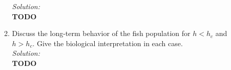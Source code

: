 \documentclass[10pt]{amsart}
\theoremstyle{nonumberplain}
\begin{document}
\begin{enumerate}[label={\bf {\arabic*}:}]
\begin{enumerate}
\noindent
\textit{Solution:} \\
\textbf{TODO} \\

\item Discuss the long-term behavior of the fish population for $h < h_c$ and $h > h_c$. 
Give the biological interpretation in each case. \\

\noindent
\textit{Solution:} \\
\textbf{TODO} \\

\end{enumerate}

\end{enumerate}
\end{document}
